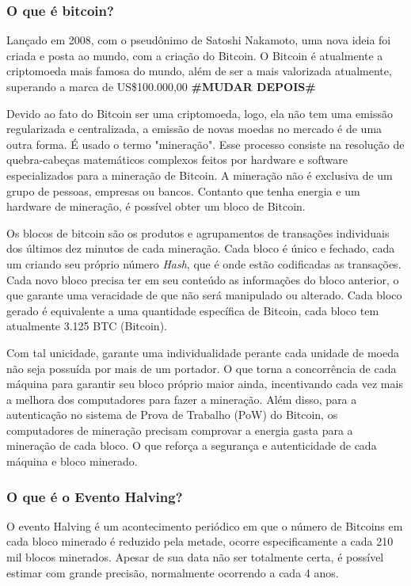 \documentclass[12pt]{article}
\begin{document}
\subsubsection*{O que é bitcoin?}
Lançado em 2008, com o pseudônimo de Satoshi Nakamoto, uma nova ideia foi criada e posta ao mundo, com a criação do Bitcoin. O Bitcoin é atualmente a criptomoeda mais famosa do mundo, além de ser a mais valorizada atualmente, superando a marca de US\$100.000,00 
\textbf{\#MUDAR DEPOIS\#}

Devido ao fato do Bitcoin ser uma criptomoeda, logo, ela não tem uma emissão regularizada e centralizada, a emissão de novas moedas no mercado é de uma outra forma. É usado o termo "mineração". Esse processo consiste na resolução de quebra-cabeças matemáticos complexos feitos por hardware e software especializados para a mineração de Bitcoin. A mineração não é exclusiva de um grupo de pessoas, empresas ou bancos. Contanto que tenha energia e um hardware de mineração, é possível obter um bloco de Bitcoin.

Os blocos de bitcoin são os produtos e agrupamentos de transações individuais dos últimos dez minutos de cada mineração. Cada bloco é único e fechado, cada um criando seu próprio número \textit{Hash}, que é onde estão codificadas as transações. Cada novo bloco precisa ter em seu conteúdo as informações do bloco anterior, o que garante uma veracidade de que não será manipulado ou alterado. Cada bloco gerado é equivalente a uma quantidade específica de Bitcoin, cada bloco tem atualmente 3.125 BTC (Bitcoin).

Com tal unicidade, garante uma individualidade perante cada unidade de moeda não seja possuída por mais de um portador. O que torna a concorrência de cada máquina para garantir seu bloco próprio maior ainda, incentivando cada vez mais a melhora dos computadores para fazer a mineração. Além disso, para a autenticação no sistema de Prova de Trabalho (PoW) do Bitcoin, os computadores de mineração precisam comprovar a energia gasta para a mineração de cada bloco. O que reforça a segurança e autenticidade de cada máquina e bloco minerado.

\subsubsection*{O que é o Evento Halving?}
O evento Halving é um acontecimento periódico em que o número de Bitcoins em cada bloco minerado é reduzido pela metade, ocorre especificamente a cada 210 mil blocos minerados. Apesar de sua data não ser totalmente certa, é possível estimar com grande precisão, normalmente ocorrendo a cada 4 anos.
\end{document}
